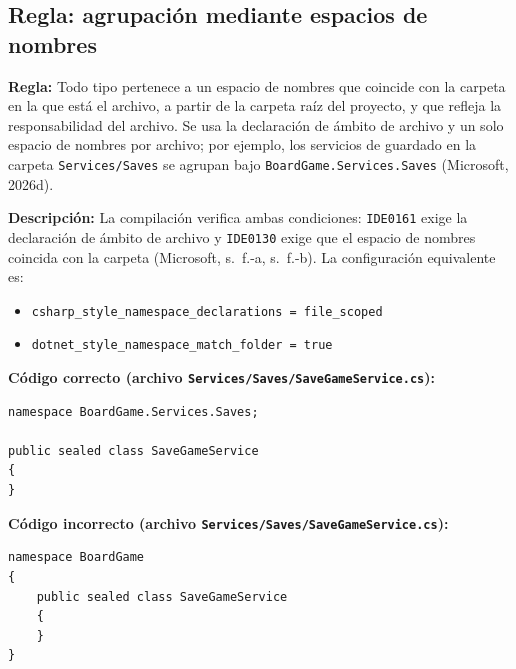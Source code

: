 \subsection{Regla: agrupación mediante espacios de nombres}

\textbf{Regla:} Todo tipo pertenece a un espacio de nombres que coincide con la carpeta en la que está el archivo, a partir de la carpeta raíz del proyecto, y que refleja la responsabilidad del archivo. Se usa la declaración de ámbito de archivo y un solo espacio de nombres por archivo; por ejemplo, los servicios de guardado en la carpeta \texttt{Services/Saves} se agrupan bajo \texttt{BoardGame.Services.Saves} (Microsoft, 2026d).

\textbf{Descripción:} La compilación verifica ambas condiciones: \texttt{IDE0161} exige la declaración de ámbito de archivo y \texttt{IDE0130} exige que el espacio de nombres coincida con la carpeta (Microsoft, s.~f.-a, s.~f.-b). La configuración equivalente es:

\begin{itemize}
  \item \texttt{csharp\_style\_namespace\_declarations = file\_scoped}
  \item \texttt{dotnet\_style\_namespace\_match\_folder = true}
\end{itemize}

\textbf{Código correcto (archivo \texttt{Services/Saves/SaveGameService.cs}):}
\begin{lstlisting}[style=csharpstyle]
namespace BoardGame.Services.Saves;

public sealed class SaveGameService
{
}
\end{lstlisting}

\textbf{Código incorrecto (archivo \texttt{Services/Saves/SaveGameService.cs}):}
\begin{lstlisting}[style=csharpstyle]
namespace BoardGame
{
    public sealed class SaveGameService
    {
    }
}
\end{lstlisting}

